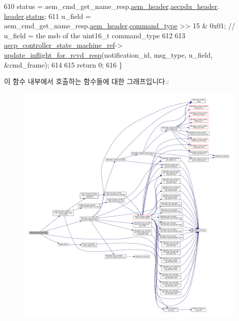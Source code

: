 \begin{DoxyCode}
610     status = aem\_cmd\_get\_name\_resp.\hyperlink{structjdksavdecc__aem__command__get__name__response_ae1e77ccb75ff5021ad923221eab38294}{aem\_header}.\hyperlink{structjdksavdecc__aecpdu__aem_ae8460ae179666e7ce268ed1ef33d0de3}{aecpdu\_header}.
      \hyperlink{structjdksavdecc__aecpdu__common_a314cacb6a61bcf18749030c0b6fb7510}{header}.\hyperlink{structjdksavdecc__aecpdu__common__control__header_ade818037fd6c985038ff29656089758d}{status};
611     u\_field = aem\_cmd\_get\_name\_resp.\hyperlink{structjdksavdecc__aem__command__get__name__response_ae1e77ccb75ff5021ad923221eab38294}{aem\_header}.\hyperlink{structjdksavdecc__aecpdu__aem_a07f7ee802870e9ae75f021832f59a8a9}{command\_type} >> 15 & 0x01; \textcolor{comment}{// u\_field
       = the msb of the uint16\_t command\_type}
612 
613     \hyperlink{namespaceavdecc__lib_a0b1b5aea3c0490f77cbfd9178af5be22}{aecp\_controller\_state\_machine\_ref}->
      \hyperlink{classavdecc__lib_1_1aecp__controller__state__machine_a997abd9786c330a5505e903e6443208e}{update\_inflight\_for\_rcvd\_resp}(notification\_id, msg\_type, u\_field, &cmd\_frame);
614 
615     \textcolor{keywordflow}{return} 0;
616 \}
\end{DoxyCode}


이 함수 내부에서 호출하는 함수들에 대한 그래프입니다.\+:
\nopagebreak
\begin{figure}[H]
\begin{center}
\leavevmode
\includegraphics[width=350pt]{classavdecc__lib_1_1descriptor__base__imp_acc8b1c1591bd54bc9a2d21d4f0db2e86_cgraph}
\end{center}
\end{figure}




